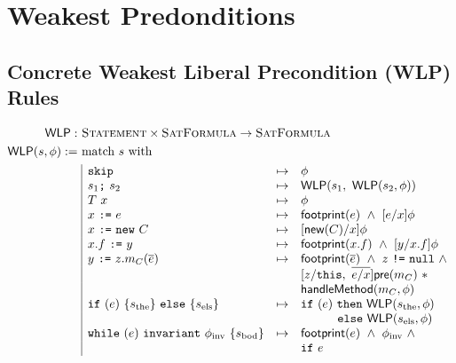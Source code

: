 \section{Weakest Predonditions}

\subsection{Concrete Weakest Liberal Precondition (WLP) Rules}

\newcommand{\WLP}{\tsf{WLP}}

\newcommand{\without}{\div}

\begin{spacing}{1.75}
\begin{align*}
\WLP : & \ \tsc{Statement} \times \tsc{SatFormula} \rightarrow \tsc{SatFormula} \\
\WLP(s, \phi) := & \ \text{match} \ s \ \text{with} \\
& \ \begin{array}{|lcl}
%
\code{skip} &\mapsto&
  \phi
\\
s_1 \code{;} \ s_2 &\mapsto&
  \WLP(s_1, \ \WLP(s_2, \phi))
\\
T \ x &\mapsto&
  \phi
\\
x \ \code{:=} \ e &\mapsto&
  \tsf{footprint}(e) \ \land \
  [ e / x ] \phi
\\
x \ \code{:=} \ \code{new} \ C &\mapsto&
  [ \tsf{new}(C) / x ] \phi
\\
x.f \ \code{:=} \ y &\mapsto&
  \tsf{footprint}(x.f) \ \land \
  [ y / x.f ] \phi
\\
y \ \code{:=} \ z.m_C(\overline{e}) &\mapsto&
  \tsf{footprint}(\overline{e}) \ \land \
  z \ \code{!=} \ \code{null} \ \land \\ &&
  [ z/\code{this}, \ \overline{e/x} ] \tsf{pre}(m_C) \ \ast \\ &&
  \tsf{handleMethod}(m_C, \phi)
\\
\code{if} \ (e) \ \{ s_\text{the} \} \ \code{else} \ \{ s_\text{els} \} &\mapsto&
  \code{if} \ (e) \
  \code{then} \ \WLP(s_\text{the}, \phi) \\ && \hspace{3em}
  \code{else} \ \WLP(s_\text{els}, \phi)
\\
\code{while} \ (e) \ \code{invariant} \ \phi_\text{inv} \ \{ s_\text{bod} \} &\mapsto&
  \tsf{footprint}(e) \ \land \
  \phi_\text{inv} \ \land \\ &&
  \code{if} \ e \

\end{array}
\end{align*}
\end{spacing}
